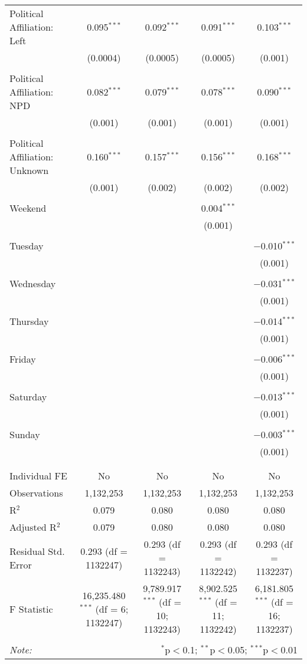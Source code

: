\documentclass[
]{article}
\begin{document}
\begin{table}[!htbp]
{\begin{tabular}{@{\extracolsep{5pt}}lcccc}
 Political Affiliation: Left & 0.095$^{***}$ & 0.092$^{***}$ & 0.091$^{***}$ & 0.103$^{***}$ \\ 
  & (0.0004) & (0.0005) & (0.0005) & (0.001) \\ 
  & & & & \\ 
 Political Affiliation: NPD & 0.082$^{***}$ & 0.079$^{***}$ & 0.078$^{***}$ & 0.090$^{***}$ \\ 
  & (0.001) & (0.001) & (0.001) & (0.001) \\ 
  & & & & \\ 
 Political Affiliation: Unknown & 0.160$^{***}$ & 0.157$^{***}$ & 0.156$^{***}$ & 0.168$^{***}$ \\ 
  & (0.001) & (0.002) & (0.002) & (0.002) \\ 
  & & & & \\ 
 Weekend &  &  & 0.004$^{***}$ &  \\ 
  &  &  & (0.001) &  \\ 
  & & & & \\ 
 Tuesday &  &  &  & $-$0.010$^{***}$ \\ 
  &  &  &  & (0.001) \\ 
  & & & & \\ 
 Wednesday &  &  &  & $-$0.031$^{***}$ \\ 
  &  &  &  & (0.001) \\ 
  & & & & \\ 
 Thursday &  &  &  & $-$0.014$^{***}$ \\ 
  &  &  &  & (0.001) \\ 
  & & & & \\ 
 Friday &  &  &  & $-$0.006$^{***}$ \\ 
  &  &  &  & (0.001) \\ 
  & & & & \\ 
 Saturday &  &  &  & $-$0.013$^{***}$ \\ 
  &  &  &  & (0.001) \\ 
  & & & & \\ 
 Sunday &  &  &  & $-$0.003$^{***}$ \\ 
  &  &  &  & (0.001) \\ 
  & & & & \\ 
\hline \\[-1.8ex] 
Individual FE & No & No & No & No \\ 
Observations & 1,132,253 & 1,132,253 & 1,132,253 & 1,132,253 \\ 
R$^{2}$ & 0.079 & 0.080 & 0.080 & 0.080 \\ 
Adjusted R$^{2}$ & 0.079 & 0.080 & 0.080 & 0.080 \\ 
Residual Std. Error & 0.293 (df = 1132247) & 0.293 (df = 1132243) & 0.293 (df = 1132242) & 0.293 (df = 1132237) \\ 
F Statistic & 16,235.480$^{***}$ (df = 6; 1132247) & 9,789.917$^{***}$ (df = 10; 1132243) & 8,902.525$^{***}$ (df = 11; 1132242) & 6,181.805$^{***}$ (df = 16; 1132237) \\ 
\hline 
\hline \\[-1.8ex] 
\textit{Note:}  & \multicolumn{4}{r}{$^{*}$p$<$0.1; $^{**}$p$<$0.05; $^{***}$p$<$0.01} \\ 
\end{tabular}
} 
\end{table} 
\end{document}
